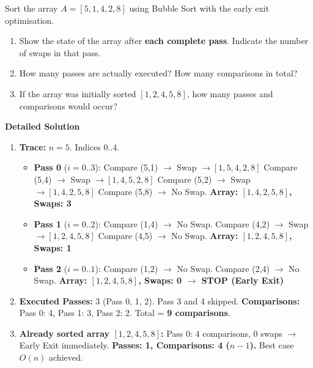 \documentclass[11pt]{article}
\begin{document}
\begin{exoresolu}
    Sort the array $A = [5, 1, 4, 2, 8]$ using Bubble Sort with the early exit optimisation.
    \begin{enumerate}
        \item Show the state of the array after \textbf{each complete pass}. Indicate the number of swaps in that pass.
        \item How many passes are actually executed? How many comparisons in total?
        \item If the array was initially sorted $[1, 2, 4, 5, 8]$, how many passes and comparisons would occur?
    \end{enumerate}
    \tcblower
    \textbf{Detailed Solution}
    \begin{enumerate}
        \item \textbf{Trace:} $n=5$. Indices 0..4.
            \begin{itemize}
                \item \textbf{Pass 0} ($i=0..3$): 
                    Compare (5,1) $\rightarrow$ Swap $\rightarrow [1,5,4,2,8]$
                    Compare (5,4) $\rightarrow$ Swap $\rightarrow [1,4,5,2,8]$
                    Compare (5,2) $\rightarrow$ Swap $\rightarrow [1,4,2,5,8]$
                    Compare (5,8) $\rightarrow$ No Swap.
                    \textbf{Array: $[1,4,2,5,8]$, Swaps: 3}
                \item \textbf{Pass 1} ($i=0..2$):
                    Compare (1,4) $\rightarrow$ No Swap.
                    Compare (4,2) $\rightarrow$ Swap $\rightarrow [1,2,4,5,8]$
                    Compare (4,5) $\rightarrow$ No Swap.
                    \textbf{Array: $[1,2,4,5,8]$, Swaps: 1}
                \item \textbf{Pass 2} ($i=0..1$):
                    Compare (1,2) $\rightarrow$ No Swap.
                    Compare (2,4) $\rightarrow$ No Swap.
                    \textbf{Array: $[1,2,4,5,8]$, Swaps: 0 $\rightarrow$ \textbf{STOP (Early Exit)}}
            \end{itemize}
        \item \textbf{Executed Passes:} 3 (Pass 0, 1, 2). Pass 3 and 4 skipped.
            \textbf{Comparisons:} Pass 0: 4, Pass 1: 3, Pass 2: 2. Total = \textbf{9 comparisons}.
        \item \textbf{Already sorted array $[1,2,4,5,8]$:}
            Pass 0: 4 comparisons, 0 swaps $\rightarrow$ Early Exit immediately.
            \textbf{Passes: 1, Comparisons: 4 ($n-1$).} Best case $O(n)$ achieved.
    \end{enumerate}
\end{exoresolu}
\end{document}
